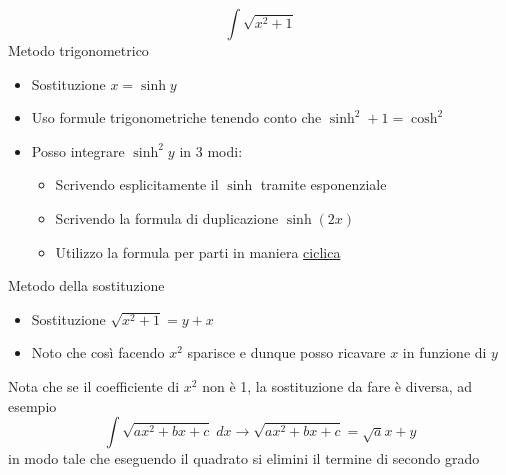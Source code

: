 \hr
\[
	\boxed{\int \sqrt{x^2 + 1}}
\]
Metodo trigonometrico
\begin{itemize}
	\item Sostituzione $ x = \sinh y $
	\item Uso formule trigonometriche tenendo conto che $ \sinh^2 + 1 = \cosh ^2 $
	\item Posso integrare $ \sinh ^2 y $ in 3 modi:
	      \begin{itemize}
		      \item Scrivendo esplicitamente il $ \sinh $ tramite esponenziale
		      \item Scrivendo la formula di duplicazione $ \sinh \left( 2x \right)  $
		      \item Utilizzo la formula per parti in maniera \underline{ciclica}
	      \end{itemize}

\end{itemize}
Metodo della sostituzione
\begin{itemize}
	\item Sostituzione $ \sqrt{x^2 + 1} = y + x $
	\item Noto che così facendo $ x^2 $ sparisce e dunque posso ricavare $ x $ in funzione di $ y $
\end{itemize}
Nota che se il coefficiente di $ x^2 $ non è 1, la sostituzione da fare è diversa, ad esempio
\[
	\int \sqrt{ax^2 + bx + c} \; dx \rightarrow \sqrt{ax^2 + bx + c} = \sqrt{a} x + y
\]
in modo tale che eseguendo il quadrato si elimini il termine di secondo grado
